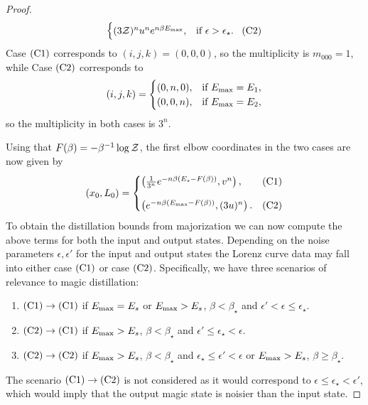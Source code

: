 \documentclass[pra,
aps,
twocolumn,
superscriptaddress,
groupedaddress,
nofootinbib,
reprint
]{revtex4-1}
\begin{document}
\begin{proof}
\begin{equation*}
\begin{cases}
		(3\mathcal{Z})^{n} u^n e^{n\beta E_{\rm{max}}}, &\mbox{if }\epsilon > \epsilon_{\star}.\ \hspace{5pt}\rm{(C2)} 
	\end{cases}
\end{equation*}
Case $\rm{(C1)}$ corresponds to $(i,j,k) = (0,0,0)$, so the multiplicity is $m_{000} = 1$, while
Case $\rm{(C2)}$ corresponds to
\begin{equation}
	(i,j,k) = 
	\begin{cases}
	(0,n,0), &\text{if } E_{\rm{max}} = E_1, \\
	(0,0,n), &\text{if } E_{\rm{max}} = E_2,
	\end{cases}
\end{equation}
so the multiplicity in both cases is $3^n$.

Using that $F(\beta) = -\beta^{-1} \log \mathcal{Z}$, the first elbow coordinates in the two cases are now given by
\begin{equation}\label{eq:first_elb_coords}
	(x_0, L_0) =
	\begin{cases}
		\left(\frac{1}{3^n} e^{-n\beta (E_s - F(\beta))}, v^n \right), &\rm{(C1)}	\vspace{10pt}\\
		\left( e^{-n\beta (E_{\rm{max}}-F(\beta))}, (3u)^n \right). &\rm{(C2)} 
	\end{cases}
\end{equation}
To obtain the distillation bounds from majorization we can now compute the above terms for both the input and output states. Depending on the noise parameters $\epsilon, \epsilon'$ for the input and output states the Lorenz curve data may fall into either case $\rm{(C1)}$ or case $\rm{(C2)}$.
Specifically, we have three scenarios of relevance to magic distillation:
\begin{enumerate}
	\item $\rm{(C1)} \rightarrow \rm{(C1)}$ if $E_{\rm{max}} = E_s$ or $E_{\rm{max}} > E_s$, $\beta < \beta_{\star}$ and $\epsilon' < \epsilon  \leq \epsilon_{\star}$.
	\item $\rm{(C2)} \rightarrow \rm{(C1)}$ if $E_{\rm{max}} > E_s$, $\beta < \beta_{\star}$ and $\epsilon' \leq \epsilon_{\star} < \epsilon$.
	\item $\rm{(C2)} \rightarrow \rm{(C2)}$ if $E_{\rm{max}} > E_s$, $\beta < \beta_{\star}$ and $\epsilon_{\star} \leq \epsilon' < \epsilon$ or $E_{\rm{max}} > E_s$, $\beta \geq \beta_{\star}$.
\end{enumerate}
The scenario $\rm{(C1)} \rightarrow \rm{(C2)}$ is not considered as it would correspond to $\epsilon \leq \epsilon_\star < \epsilon'$, which would imply that the output magic state is noisier than the input state.


\end{proof}
\end{document}

